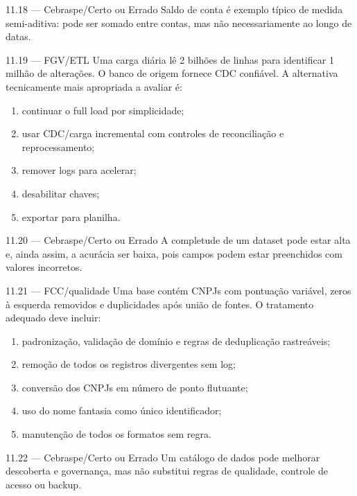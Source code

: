 \begin{questao}{ 11.18 — Cebraspe/Certo ou Errado}
Saldo de conta é exemplo típico de medida semi-aditiva: pode ser somado entre contas, mas não necessariamente ao longo de datas.
\end{questao}

\begin{questao}{ 11.19 — FGV/ETL}
Uma carga diária lê 2 bilhões de linhas para identificar 1 milhão de alterações. O banco de origem fornece CDC confiável. A alternativa tecnicamente mais apropriada a avaliar é:
\begin{enumerate}[label=\Alph*)]
\item continuar o full load por simplicidade;
\item usar CDC/carga incremental com controles de reconciliação e reprocessamento;
\item remover logs para acelerar;
\item desabilitar chaves;
\item exportar para planilha.
\end{enumerate}
\end{questao}

\begin{questao}{ 11.20 — Cebraspe/Certo ou Errado}
A completude de um dataset pode estar alta e, ainda assim, a acurácia ser baixa, pois campos podem estar preenchidos com valores incorretos.
\end{questao}

\begin{questao}{ 11.21 — FCC/qualidade}
Uma base contém CNPJs com pontuação variável, zeros à esquerda removidos e duplicidades após união de fontes. O tratamento adequado deve incluir:
\begin{enumerate}[label=\Alph*)]
\item padronização, validação de domínio e regras de deduplicação rastreáveis;
\item remoção de todos os registros divergentes sem log;
\item conversão dos CNPJs em número de ponto flutuante;
\item uso do nome fantasia como único identificador;
\item manutenção de todos os formatos sem regra.
\end{enumerate}
\end{questao}

\begin{questao}{ 11.22 — Cebraspe/Certo ou Errado}
Um catálogo de dados pode melhorar descoberta e governança, mas não substitui regras de qualidade, controle de acesso ou backup.
\end{questao}

